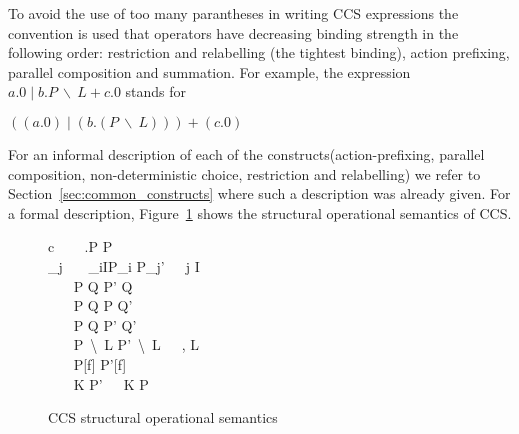 	To avoid the use of too many parantheses in writing CCS expressions 
	the convention is used that operators have decreasing binding strength in 
	the following order: restriction and relabelling (the tightest binding), 
	action prefixing, parallel composition and summation. For example, the 
	expression $a.0 \mid b.P\ \backslash\ L + c.0$ stands for
		
	\begin{center}$((a.0) \mid (b.(P\ \backslash\ L))) + (c.0)$\end{center}
		
	For an informal description of each of the constructs(action-prefixing, 
	parallel composition, non-deterministic choice, restriction and relabelling) 
	we refer to Section~\ref{sec:common_constructs} where such a description was 
	already given. For a formal description, Figure~\ref{fig:ccs_sos} shows the 
	structural operational semantics of CCS.


\begin{figure}[t!]
\begin{ARRAY}{c}
	\ \ \ \Inference{                              }
	                            {\alpha.P \infarrow{\alpha} P} \vspace{10pt}\\
	_j\ \ \ 
	                              {\sum_{i\in I}P_i \infarrow{\alpha} P_j'}\ \ \ j \in I\vspace{10pt}\\
	\ \ \ 
	                             {P \mid Q \infarrow{\alpha} P' \mid Q} \vspace{10pt}\\
	\ \ \ 
	                             {P \mid Q \infarrow{\alpha} P \mid Q'} \vspace{10pt}\\
	\ \ \ 
	                             {P \mid Q \infarrow{\tau} P' \mid Q'} \vspace{10pt}\\
	\ \ \ 
	                              {P\ \backslash\ L \infarrow{\alpha} P'\  \backslash\ L}\ \ \ \alpha, \overline{\alpha} \notin L\vspace{10pt}\\
	\ \ \ 
	                             {P[f]  P'[f]} \vspace{10pt}\\
	\ \ \ 
	                             {K \infarrow{\alpha} P'}\ \ \ K  P

\end{ARRAY}
\caption{CCS structural operational semantics}\label{fig:ccs_sos}
\end{figure}

